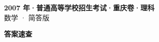 \documentclass[zihao=-4, a4paper]{ctexart}
\begin{document}
\begin{center}
  {\Large\bfseries 2007 年·普通高等学校招生考试·重庆卷·理科}\\[4pt]
  {\large 数学 · 简答版}
\end{center}
\medskip
{}

\clearpage
{}
\begin{center}{\Large\bfseries 答案速查}\end{center}
\medskip

\end{document}

